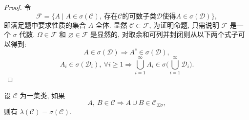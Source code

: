         \begin{proof}
            令\[
            \mathcal{F}=\{A\mid A\in\sigma(\mathcal{C}),\ 存在 \mathcal{C} 的可数子类 \mathcal{D} 使得 A\in\sigma(\mathcal{D})\}, 
            \] 
            即满足题中要求性质的集合 $A$ 全体. 
            显然 $\mathcal{C}\subset \mathcal{F}$, 为证明命题, 只需说明 $\mathcal{F}$ 是一个 $\sigma$ 代数. 
            $\Omega\in\mathcal{F}$ 和 $\varnothing\in\mathcal{F}$ 是显然的, 
            对取余和可列并封闭则从以下两个式子可以得到: 
            \[
                A\in\sigma(\mathcal{D})\Rightarrow A^c\in\sigma(\mathcal{D}), 
            \]
            \[
                A_i\in\sigma(\mathcal{D}_i),\ \forall i\geqslant 1\Rightarrow \bigcup_{i=1}^\infty A_i\in\sigma\bigl(\bigcup_{i=1}^\infty \mathcal{D}_i\bigr).
            \]

            
        \end{proof}
        \begin{5}
            设 $\mathcal{C}$ 为一集类, 如果
            \[
                A,\ B\in\mathcal{C}\Rightarrow A\cup B\in\mathcal{C}_{\Sigma\sigma},
            \]
            则有 $\lambda(\mathcal{C})=\sigma(\mathcal{C})$.
        \end{5}
